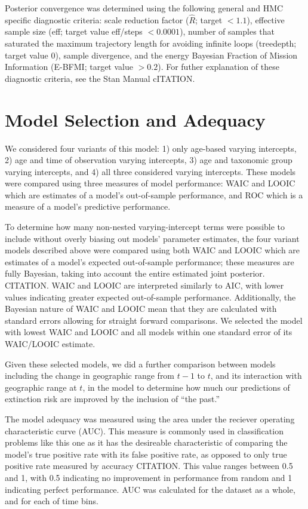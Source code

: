 \documentclass[12pt,letterpaper]{article}
\begin{document}
Posterior convergence was determined using the following general and HMC specific diagnostic criteria: scale reduction factor (\(\hat{R}\); target \(<1.1\)), effective sample size (eff; target value eff/steps \(<0.0001\)), number of samples that saturated the maximum trajectory length for avoiding infinite loops (treedepth; target value 0), sample divergence, and the energy Bayesian Fraction of Mission Information (E-BFMI; target value \(>0.2\)). For futher explanation of these diagnostic criteria, see the Stan Manual cITATION.


\section{Model Selection and Adequacy}

We considered four variants of this model: 1) only age-based varying intercepts, 2) age and time of observation varying intercepts, 3) age and taxonomic group varying intercepts, and 4) all three considered varying intercepts. These models were compared using three measures of model performance: WAIC and LOOIC which are estimates of a model's out-of-sample performance, and ROC which is a measure of a model's predictive performance.

To determine how many non-nested varying-intercept terms were possible to include without overly biasing out models' parameter estimates, the four variant models described above were compared using both WAIC and LOOIC which are estimates of a model's expected out-of-sample performance; these measures are fully Bayesian, taking into account the entire estimated joint posterior. CITATION. WAIC and LOOIC are interpreted similarly to AIC, with lower values indicating greater expected out-of-sample performance. Additionally, the Bayesian nature of WAIC and LOOIC mean that they are calculated with standard errors allowing for straight forward comparisons. We selected the model with lowest WAIC and LOOIC and all models within one standard error of its WAIC/LOOIC estimate.

Given these selected models, we did a further comparison between models including the change in geographic range from \(t - 1\) to \(t\), and its interaction with geographic range at \(t\), in the model to determine how much our predictions of extinction risk are improved by the inclusion of ``the past.''

The model adequacy was measured using the area under the reciever operating characteristic curve (AUC). This measure is commonly used in classification problems like this one as it has the desireable characteristic of comparing the model's true positive rate with its false positive rate, as opposed to only true positive rate measured by accuracy CITATION. This value ranges between 0.5 and 1, with 0.5 indicating no improvement in performance from random and 1 indicating perfect performance. AUC was calculated for the dataset as a whole, and for each of time bins.
\end{document}
